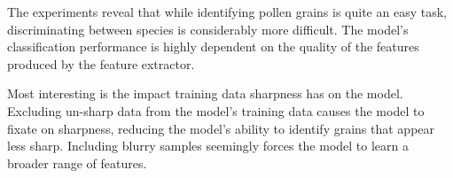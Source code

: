 The experiments reveal that while identifying pollen grains is quite an easy task, discriminating between species is considerably more difficult.
The model's classification performance is highly dependent on the quality of the features produced by the feature extractor.

Most interesting is the impact training data sharpness has on the model.
Excluding un-sharp data from the model's training data causes the model to fixate on sharpness, reducing the model's ability to identify grains that appear less sharp.
Including blurry samples seemingly forces the model to learn a broader range of features.
